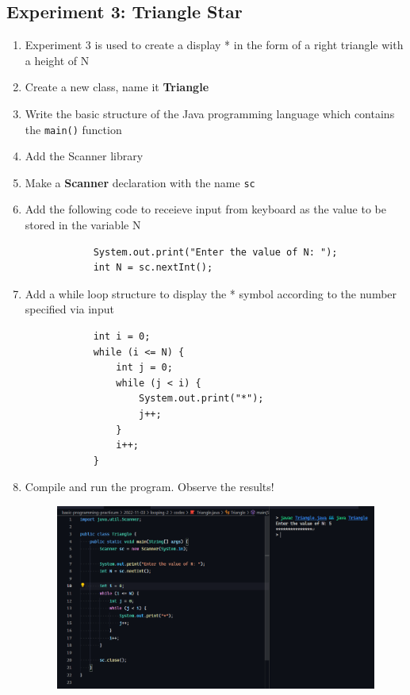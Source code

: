 \documentclass[12pt,titlepage]{article}
\begin{document}
\subsection{Experiment 3: Triangle Star}
\begin{enumerate}
    \item Experiment 3 is used to create a display * in the form of a right triangle with a height of N
    \item Create a new class, name it \textbf{Triangle}
    \item Write the basic structure of the Java programming language which contains the \texttt{main()} function
    \item Add the Scanner library
    \item Make a \textbf{Scanner} declaration with the name \texttt{sc}
    \item {
        Add the following code to receieve input from keyboard as the value to be stored in the variable N

        \begin{verbatim}
            System.out.print("Enter the value of N: ");
            int N = sc.nextInt();
        \end{verbatim}
    }
    \item {
        Add a while loop structure to display the * symbol according to the number specified via input

        \begin{verbatim}
            int i = 0;
            while (i <= N) {
                int j = 0;
                while (j < i) {
                    System.out.print("*");
                    j++;
                }
                i++;
            }
        \end{verbatim}
    }
    \item {
        Compile and run the program. Observe the results!

        \begin{figure}[h]
            \centering
            \includegraphics[width=.8\textwidth]{./images/triangle.png}
        \end{figure}
    }
\end{enumerate}
\end{document}
